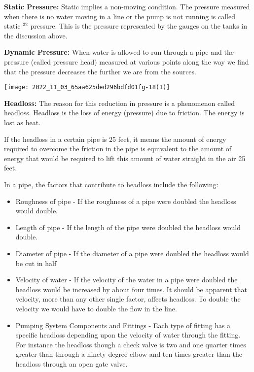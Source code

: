 \textbf{Static Pressure: } Static implies a non-moving condition.  The pressure measured when there is no water moving in a line or the pump is not running is called static $^{32}$ pressure. This is the pressure represented by the gauges on the tanks in the discussion above.

\textbf{Dynamic Pressure: } When water is allowed to run through a pipe and the pressure (called pressure head) measured at various points along the way we find that the pressure decreases the further we are from the sources.
\begin{center}
\texttt{[image: 2022\_11\_03\_65aa625ded296bdfd01fg-18(1)]}
\end{center}
\textbf{Headloss: }  The reason for this reduction in pressure is a phenomenon called headloss. Headloss is the loss of energy (pressure) due to friction. The energy is lost as heat.

If the headloss in a certain pipe is 25 feet, it means the amount of energy required to overcome the friction in the pipe is equivalent to the amount of energy that would be required to lift this amount of water straight in the air 25 feet.

In a pipe, the factors that contribute to headloss include the following:

\begin{itemize}
  \item Roughness of pipe - If the roughness of a pipe were doubled the headloss would double.

  \item Length of pipe - If the length of the pipe were doubled the headloss would double.

  \item Diameter of pipe - If the diameter of a pipe were doubled the headloss would be cut in half

  \item Velocity of water - If the velocity of the water in a pipe were doubled the headloss would be increased by about four times. It should be apparent that velocity, more than any other single factor, affects headloss. To double the velocity we would have to double the flow in the line.
  
  \item Pumping System Components and Fittings - Each type of fitting has a specific headloss depending upon the velocity of water through the fitting. For instance the headloss though a check valve is two and one quarter times greater than through a ninety degree elbow and ten times greater than the headloss through an open gate valve.

\end{itemize}

